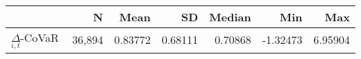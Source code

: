 \begin{tabular}{lrrrrrr}
  \hline
 & N & Mean & SD & Median & Min & Max \\ 
  \hline
$\Delta$-CoVaR$_{i,t}$ & 36,894 & 0.83772 & 0.68111 & 0.70868 & -1.32473 & 6.95904 \\ 
   \hline
\end{tabular}
